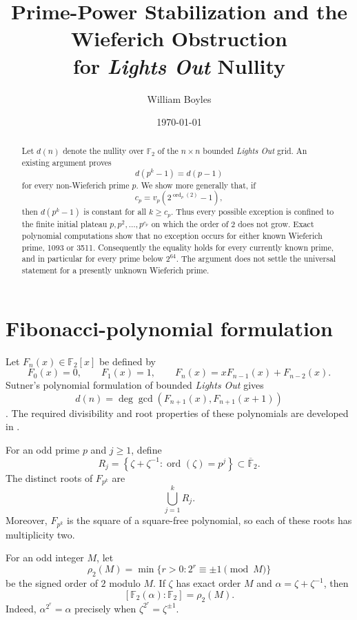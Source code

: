 \documentclass[a4paper]{article}
\newcommand{\F}{\mathbb{F}}
\newcommand{\ord}[2][]{\operatorname{ord}_{#1}\!\left(#2\right)}
\begin{document}
\title{Prime-Power Stabilization and the Wieferich Obstruction\\
for \textit{Lights Out} Nullity}
\author{William Boyles}
\date{\today}
\maketitle

\begin{abstract}
	Let $d(n)$ denote the nullity over $\F_2$ of the $n \times n$ bounded \textit{Lights Out} grid.
	An existing argument proves
	\[
		d(p^k-1)=d(p-1)
	\]
	for every non-Wieferich prime $p$.
	We show more generally that, if
	\[
		c_p=v_p\!\left(2^{\ord[p]{2}}-1\right),
	\]
	then $d(p^k-1)$ is constant for all $k\geq c_p$.
	Thus every possible exception is confined to the finite initial plateau
	$p,p^2,\ldots,p^{c_p}$ on which the order of $2$ does not grow.
	Exact polynomial computations show that no exception occurs for either known Wieferich prime, 1093 or 3511.
	Consequently the equality holds for every currently known prime, and in particular for every prime below $2^{64}$.
	The argument does not settle the universal statement for a presently unknown Wieferich prime.
\end{abstract}

\section{Fibonacci-polynomial formulation}

Let $F_n(x)\in\F_2[x]$ be defined by
\[
	F_0(x)=0,\qquad F_1(x)=1,\qquad
	F_n(x)=xF_{n-1}(x)+F_{n-2}(x).
\]
Sutner's polynomial formulation of bounded \textit{Lights Out} gives
\begin{equation}\label{eq:nullity-gcd}
	d(n)=\deg\gcd\!\left(F_{n+1}(x),F_{n+1}(x+1)\right)
\end{equation}
\cite{Sutner2000}.
The required divisibility and root properties of these polynomials are developed in
\cite{HUNZIKER2004465}.

For an odd prime $p$ and $j\geq1$, define
\[
	R_j=\left\{\zeta+\zeta^{-1}:\ord{\zeta}=p^j\right\}
	\subset\overline{\F}_2.
\]
The distinct roots of $F_{p^k}$ are
\begin{equation}\label{eq:root-union}
	\bigcup_{j=1}^k R_j.
\end{equation}
Moreover, $F_{p^k}$ is the square of a square-free polynomial, so each of these roots has multiplicity two.

For an odd integer $M$, let
\[
	\rho_2(M)=\min\{r>0:2^r\equiv\pm1\pmod M\}
\]
be the signed order of $2$ modulo $M$.
If $\zeta$ has exact order $M$ and $\alpha=\zeta+\zeta^{-1}$, then
\begin{equation}\label{eq:field-degree}
	[\F_2(\alpha):\F_2]=\rho_2(M).
\end{equation}
Indeed, $\alpha^{2^r}=\alpha$ precisely when $\zeta^{2^r}=\zeta^{\pm1}$.
\end{document}
